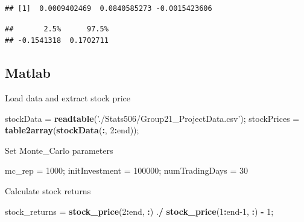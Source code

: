 \documentclass[]{book}
\newenvironment{Shaded}{\begin{snugshade}}{\end{snugshade}}
\newcommand{\CommentTok}[1]{\textcolor[rgb]{0.56,0.35,0.01}{\textit{#1}}}
\newcommand{\DecValTok}[1]{\textcolor[rgb]{0.00,0.00,0.81}{#1}}
\newcommand{\FloatTok}[1]{\textcolor[rgb]{0.00,0.00,0.81}{#1}}
\newcommand{\KeywordTok}[1]{\textcolor[rgb]{0.13,0.29,0.53}{\textbf{#1}}}
\newcommand{\NormalTok}[1]{#1}
\newcommand{\OperatorTok}[1]{\textcolor[rgb]{0.81,0.36,0.00}{\textbf{#1}}}
\newcommand{\StringTok}[1]{\textcolor[rgb]{0.31,0.60,0.02}{#1}}
\begin{document}
\begin{verbatim}
## [1]  0.0009402469  0.0840585273 -0.0015423606
\end{verbatim}

\begin{Shaded}
\end{Shaded}

\begin{verbatim}
##       2.5%      97.5% 
## -0.1541318  0.1702711
\end{verbatim}

\hypertarget{matlab}{%
\subsection{Matlab}\label{matlab}}

Load data and extract stock price

\begin{Shaded}
\begin{Highlighting}[]
\NormalTok{stockData =}\StringTok{ }\KeywordTok{readtable}\NormalTok{(}\StringTok{'./Stats506/Group21_ProjectData.csv'}\NormalTok{);}
\NormalTok{stockPrices =}\StringTok{ }\KeywordTok{table2array}\NormalTok{(}\KeywordTok{stockData}\NormalTok{(}\OperatorTok{:}\NormalTok{, }\DecValTok{2}\OperatorTok{:}\NormalTok{end));}
\end{Highlighting}
\end{Shaded}

Set Monte\_Carlo parameters

\begin{Shaded}
\begin{Highlighting}[]
\NormalTok{mc_rep =}\StringTok{ }\DecValTok{1000}\NormalTok{;}
\NormalTok{initInvestment =}\StringTok{ }\DecValTok{100000}\NormalTok{;}
\NormalTok{numTradingDays =}\StringTok{ }\DecValTok{30}
\end{Highlighting}
\end{Shaded}

Calculate stock returns

\begin{Shaded}
\begin{Highlighting}[]
\NormalTok{stock_returns =}\StringTok{ }\KeywordTok{stock_price}\NormalTok{(}\DecValTok{2}\OperatorTok{:}\NormalTok{end, }\OperatorTok{:}\NormalTok{) .}\OperatorTok{/}\StringTok{ }\KeywordTok{stock_price}\NormalTok{(}\DecValTok{1}\OperatorTok{:}\NormalTok{end}\DecValTok{-1}\NormalTok{, }\OperatorTok{:}\NormalTok{) }\OperatorTok{-}\StringTok{ }\DecValTok{1}\NormalTok{;}
\end{Highlighting}
\end{Shaded}
\end{document}
